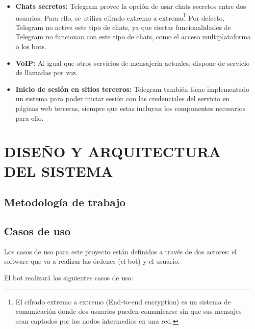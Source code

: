 \documentclass[spanish,12pt, a4paper, twoside]{paper}
\let\oldsection\section
\def\section{\cleardoublepage\oldsection}
\begin{document}
\begin{itemize}
\item \textbf{Chats secretos:} Telegram provee la opción de usar chats secretos entre dos usuarios. Para ello, se utiliza cifrado extremo a extremo\footnote{El cifrado extremo a extremo (End-to-end encryption) es un sistema de comunicación donde dos usuarios pueden comunicarse sin que sus mensajes sean captados por los nodos intermedios en una red.} Por defecto, Telegram no activa este tipo de chats, ya que ciertas funcionalidades de Telegram no funcionan con este tipo de chats, como el acceso multiplataforma o los bots.

\item \textbf{VoIP:} Al igual que otros servicios de mensajería actuales, dispone de servicio de llamadas por voz. 

\item \textbf{Inicio de sesión en sitios terceros:} Telegram también tiene implementado un sistema para poder iniciar sesión con las credenciales del servicio en páginas web terceras, siempre que estas incluyan los componentes necesarios para ello. 

\end{itemize}

\section{DISEÑO Y ARQUITECTURA DEL SISTEMA}

\subsection{Metodología de trabajo}

\subsection{Casos de uso}

Los casos de uso para este proyecto están definidos a través de dos actores: el software que va a realizar las órdenes (el bot) y el usuario.

El bot realizará los siguientes casos de uso:
\end{document}
